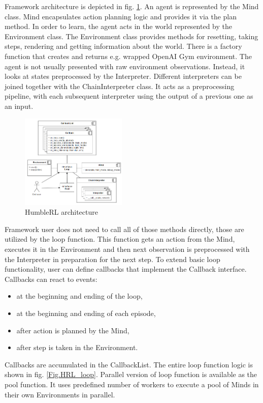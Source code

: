 Framework architecture is depicted in fig. \ref{Fig.HRL_architecture}. An agent is represented by the Mind class. Mind encapsulates action planning logic and provides it via the plan method. In order to learn, the agent acts in the world represented by the Environment class. The Environment class provides methods for resetting, taking steps, rendering and getting information about the world. There is a factory function that creates and returns e.g. wrapped OpenAI Gym environment. The agent is not usually presented with raw environment observations. Instead, it looks at states preprocessed by the Interpreter. Different interpreters can be joined together with the ChainInterpreter class. It acts as a preprocessing pipeline, with each subsequent interpreter using the output of a previous one as an input.

\begin{figure}[H]
\includegraphics[width=0.45\textwidth,height=0.9\textheight,keepaspectratio]{figures/HumbleRL/architecture.png}
\caption{HumbleRL architecture}
\label{Fig.HRL_architecture}
\end{figure}

Framework user does not need to call all of those methods directly, those are utilized by the loop function. This function gets an action from the Mind, executes it in the Environment and then next observation is preprocessed with the Interpreter in preparation for the next step. To extend basic loop functionality, user can define callbacks that implement the Callback interface. Callbacks can react to events:
\begin{itemize}
\item at the beginning and ending of the loop,
\item at the beginning and ending of each episode,
\item after action is planned by the Mind,
\item after step is taken in the Environment.
\end{itemize}
Callbacks are accumulated in the CallbackList. The entire loop function logic is shown in fig. \ref{Fig.HRL_loop}.
Parallel version of loop function is available as the pool function. It uses predefined number of workers to execute a pool of Minds in their own Environments in parallel.

